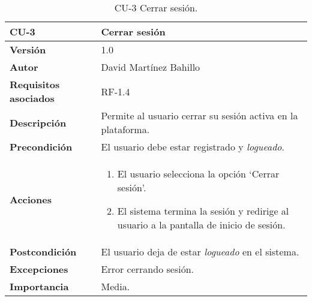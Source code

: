 \begin{table}[p]
	\centering
	\begin{tabularx}{\linewidth}{ p{} p{} }
		\toprule
		\textbf{CU-3}    & \textbf{Cerrar sesión}\\
		\midrule
		\textbf{Versión}              & 1.0    \\
		\textbf{Autor}                & David Martínez Bahillo \\
		\textbf{Requisitos asociados} & RF-1.4 \\
		\textbf{Descripción}          & Permite al usuario cerrar su sesión activa en la plataforma. \\
		\textbf{Precondición}         & El usuario debe estar registrado y \textit{logueado}. \\
		\textbf{Acciones}             &
		\begin{enumerate}
			\def\labelenumi{\arabic{enumi}.}
			\tightlist
			\item El usuario selecciona la opción `Cerrar sesión'.
			\item El sistema termina la sesión y redirige al usuario a la pantalla de inicio de sesión.
		\end{enumerate}\\
		\textbf{Postcondición}        & El usuario deja de estar \textit{logueado} en el sistema. \\
		\textbf{Excepciones}          & Error cerrando sesión. \\
		\textbf{Importancia}          & Media.  \\
		\bottomrule
	\end{tabularx}
	\caption{CU-3 Cerrar sesión.}
\end{table}


